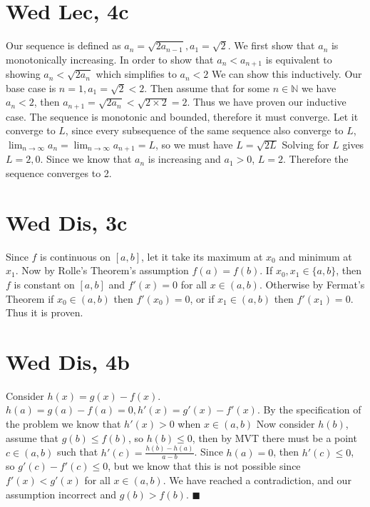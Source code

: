\documentclass[12pt]{article}
\newcommand{\N}{\mathbb{N}}
\begin{document}
\section{Wed Lec, 4c}
Our sequence is defined as $a_n = \sqrt{2a_{n-1}}, a_1 = \sqrt{2}$. We first show that $a_n$ is monotonically increasing. In order to show that $a_n < a_{n+1}$ is equivalent to showing $a_n < \sqrt{2a_{n}}$ which simplifies to $a_n < 2$
\newline
We can show this inductively. Our base case is $n=1, a_1 = \sqrt{2}<2$. Then assume that for some $n \in \N$ we have $a_n < 2$, then $a_{n+1} = \sqrt{2a_n} < \sqrt{2 \times 2} = 2$. Thus we have proven our inductive case.
\newline
The sequence is monotonic and bounded, therefore it must converge. Let it converge to $L$, since every subsequence of the same sequence also converge to $L$, $\lim_{n \to \infty}a_n = \lim_{n \to \infty}a_{n+1}=L$, so we must have $L = \sqrt{2L}$
\newline
Solving for $L$ gives $L = 2,0$. Since we know that $a_n$ is increasing and $a_1>0$, $L=2$. Therefore the sequence converges to 2.
\newpage


\section{Wed Dis, 3c}
Since $f$ is continuous on $[a,b]$, let it take its maximum at $x_0$ and minimum at $x_1$. Now by Rolle's Theorem's assumption $f(a)=f(b)$. If $x_0, x_1 \in \{a,b\}$, then $f$ is constant on $[a,b]$ and $f'(x)=0$ for all $x \in (a,b)$. Otherwise by Fermat's Theorem if $x_0 \in (a,b)$ then $f'(x_0)=0$, or if $x_1 \in (a,b)$ then $f'(x_1)=0$. Thus it is proven.

\section{Wed Dis, 4b}
Consider $h(x)=g(x)-f(x)$. $h(a) = g(a)-f(a)=0, h'(x)=g'(x)-f'(x)$. By the specification of the problem we know that $h'(x) > 0 $ when $x \in (a,b)$
\newline
Now consider $h(b)$, assume that $g(b) \leq f(b)$, so $h(b) \leq 0$, then by MVT there must be a point $c \in (a,b)$ such that $h'(c) = \frac{h(b)-h(a)}{a-b}$. Since $h(a)=0$, then $h'(c)\leq 0$, so $g'(c)-f'(c)\leq 0$, but we know that this is not possible since $f'(x)<g'(x)$ for all $x \in (a,b)$. We have reached a contradiction, and our assumption incorrect and $g(b)>f(b)$.
\newline
$\blacksquare$
\newpage
\end{document}
